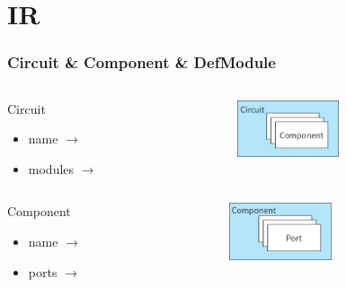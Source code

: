 \section{IR}

\begin{frame}
  \frametitle{Circuit \& Component \& DefModule}

  \begin{columns}
    \begin{column}{0.5\textwidth}
      \begin{block}{Circuit}
        \begin{itemize}
	  \item name    \(\rightarrow\) 
	  \item modules \(\rightarrow\) 
        \end{itemize}
      \end{block}
    \end{column}
    \begin{column}{0.5\textwidth}
      \includegraphics[width=3cm]{./fig/ir/circuit.png}
    \end{column}
  \end{columns}
  \begin{columns}
    \begin{column}{0.5\textwidth}
      \begin{block}{Component}
        \begin{itemize}
          \item name  \(\rightarrow\)  
          \item ports \(\rightarrow\) 
        \end{itemize}
      \end{block}
    \end{column}
    \begin{column}{0.5\textwidth}
      \includegraphics[width=3cm]{./fig/ir/component.png}
    \end{column}
  \end{columns}
  \begin{columns}
    \begin{column}{0.5\textwidth}

\end{column}
\end{columns}
\end{frame}
